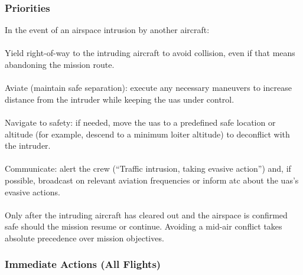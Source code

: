             \subsubsection{Priorities} In the event of an airspace intrusion by another aircraft:
            
                \paragraph{}Yield right-of-way to the intruding aircraft to avoid collision, even if that means abandoning the mission route.
                
                \paragraph{}Aviate (maintain safe separation): execute any necessary maneuvers to increase distance from the intruder while keeping the \ac{uas} under control.
                
                \paragraph{}Navigate to safety: if needed, move the \ac{uas} to a predefined safe location or altitude (for example, descend to a minimum loiter altitude) to deconflict with the intruder.
                
                \paragraph{}Communicate: alert the crew (“Traffic intrusion, taking evasive action”) and, if possible, broadcast on relevant aviation frequencies or inform \ac{atc} about the \ac{uas}’s evasive actions.
                
                \paragraph{}Only after the intruding aircraft has cleared out and the airspace is confirmed safe should the mission resume or continue. Avoiding a mid-air conflict takes absolute precedence over mission objectives.
 
            \subsubsection{Immediate Actions (All Flights)}
            
